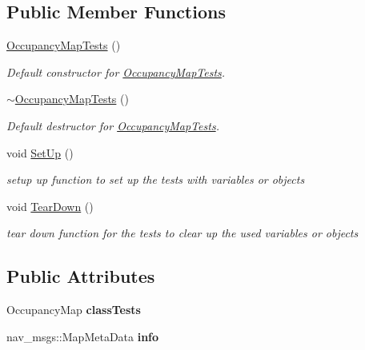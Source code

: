 \subsection*{Public Member Functions}
\begin{DoxyCompactItemize}
\item 
\hyperlink{classOccupancyMapTests_a50884cb585e62918588e36a80e0c768d}{Occupancy\+Map\+Tests} ()
\begin{DoxyCompactList}\small\item\em Default constructor for \hyperlink{classOccupancyMapTests}{Occupancy\+Map\+Tests}. \end{DoxyCompactList}\item 
\hyperlink{classOccupancyMapTests_ad9eecc1447f3238ba41c0cf30d865a82}{$\sim$\+Occupancy\+Map\+Tests} ()
\begin{DoxyCompactList}\small\item\em Default destructor for \hyperlink{classOccupancyMapTests}{Occupancy\+Map\+Tests}. \end{DoxyCompactList}\item 
void \hyperlink{classOccupancyMapTests_adbc4a2d53512b953005c64236de293b4}{Set\+Up} ()
\begin{DoxyCompactList}\small\item\em setup up function to set up the tests with variables or objects \end{DoxyCompactList}\item 
void \hyperlink{classOccupancyMapTests_a2fb286097387c627a3ab9c014e650d13}{Tear\+Down} ()
\begin{DoxyCompactList}\small\item\em tear down function for the tests to clear up the used variables or objects \end{DoxyCompactList}\end{DoxyCompactItemize}
\subsection*{Public Attributes}
\begin{DoxyCompactItemize}
\item 
Occupancy\+Map {\bfseries class\+Tests}\hypertarget{classOccupancyMapTests_ae95a87c63db4005c7c98c25dcee513c0}{}\label{classOccupancyMapTests_ae95a87c63db4005c7c98c25dcee513c0}

\item 
nav\+\_\+msgs\+::\+Map\+Meta\+Data {\bfseries info}\hypertarget{classOccupancyMapTests_a9356aeecd67cfffbb65a0b2c48d3b493}{}\label{classOccupancyMapTests_a9356aeecd67cfffbb65a0b2c48d3b493}

\end{DoxyCompactItemize}


